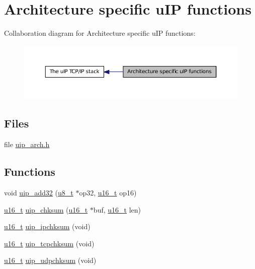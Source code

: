 \hypertarget{group__uiparch}{
\section{Architecture specific uIP functions}
\label{group__uiparch}
}


Collaboration diagram for Architecture specific uIP functions:
\nopagebreak
\begin{figure}[H]
\begin{center}
\leavevmode
\includegraphics[width=400pt]{group__uiparch}
\end{center}
\end{figure}


\subsection*{Files}
\begin{DoxyCompactItemize}
\item 
file \hyperlink{uip__arch_8h}{uip\_\-arch.h}
\end{DoxyCompactItemize}
\subsection*{Functions}
\begin{DoxyCompactItemize}
\item 
void \hyperlink{group__uiparch_ga6832e4d2d046536b6472f7ac92340f68}{uip\_\-add32} (\hyperlink{group__uipfw_ga4caecabca98b43919dd11be1c0d4cd8e}{u8\_\-t} $\ast$op32, \hyperlink{group__uipfw_ga77570ac4fcab86864fa1916e55676da2}{u16\_\-t} op16)
\item 
\hyperlink{group__uipfw_ga77570ac4fcab86864fa1916e55676da2}{u16\_\-t} \hyperlink{group__uiparch_gab6683dd83fe1c8de9a24086d4b69e907}{uip\_\-chksum} (\hyperlink{group__uipfw_ga77570ac4fcab86864fa1916e55676da2}{u16\_\-t} $\ast$buf, \hyperlink{group__uipfw_ga77570ac4fcab86864fa1916e55676da2}{u16\_\-t} len)
\item 
\hyperlink{group__uipfw_ga77570ac4fcab86864fa1916e55676da2}{u16\_\-t} \hyperlink{group__uiparch_ga2addf34c7d457c1a7899a7e2171ef1e9}{uip\_\-ipchksum} (void)
\item 
\hyperlink{group__uipfw_ga77570ac4fcab86864fa1916e55676da2}{u16\_\-t} \hyperlink{group__uiparch_ga85b65e38aa74eba18979156f97a94a87}{uip\_\-tcpchksum} (void)
\item 
\hyperlink{group__uipfw_ga77570ac4fcab86864fa1916e55676da2}{u16\_\-t} \hyperlink{group__uiparch_ga7023a34ba9e9d03b5fbedbcb32924453}{uip\_\-udpchksum} (void)
\end{DoxyCompactItemize}
